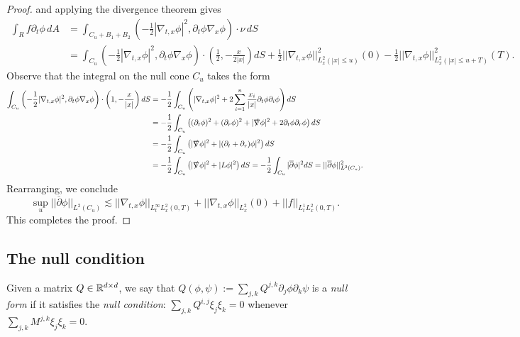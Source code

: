\begin{proof}
	and applying the divergence theorem gives
		\begin{align*}
			\int_R f \partial_t \phi \, dA
				& = \int_{C_{u} + B_1 + B_2} \left( -\frac12 |\nabla_{t, x} \phi|^2, \partial_t \phi \nabla_x \phi \right) \cdot \nu \, dS \\
				&= \int_{C_{u}} \left( -\frac12 |\nabla_{t, x} \phi|^2, \partial_t \phi \nabla_x \phi \right) \cdot  \left( \frac12, -\frac{x}{2|x|} \right)  dS + \frac12 || \nabla_{t, x} \phi||^2_{L^2_x (|x| \leq u)} (0) - \frac12 ||\nabla_{t, x} \phi||_{L^2_x (|x| \leq u + T)}^2 (T).
		\end{align*}	
	Observe that the integral on the null cone $C_u$ takes the form
		\begin{align*}
			\int_{C_u} \left( -\frac12 |\nabla_{t, x} \phi|^2, \partial_t \phi \nabla_x \phi \right) \cdot \left( 1, -\frac{x}{|x|} \right) dS
				&= - \frac12 \int_{C_u} \left( |\nabla_{t, x} \phi|^2  + 2 \sum_{i = 1}^n \frac{x_i}{|x|} \partial_t \phi \partial_i \phi \right) dS \\
				&= - \frac12 \int_{C_u} \left( (\partial_t \phi)^2 + (\partial_r \phi)^2 + |\slashed \nabla \phi|^2 + 2\partial_t \phi \partial_r \phi\right) dS\\
				&= - \frac12 \int_{C_u} \left(|\slashed \nabla \phi|^2 + |(\partial_t + \partial_r) \phi|^2\right)  dS\\
				&= -\frac12 \int_{C_u} \left(|\slashed \nabla \phi|^2 + |L \phi|^2 \right)  dS = - \frac12 \int_{C_u} |\overline\partial \phi|^2 dS = ||\overline \partial \phi||_{L^2 (C_u)}^2.
		\end{align*}	
	Rearranging, we conclude
			\[  \sup_{u} ||\overline \partial \phi ||_{L^2 (C_u)} \lesssim || \nabla_{t, x} \phi ||_{L^\infty_t L^2_x (0, T)}  +  ||\nabla_{t, x} \phi||_{L^2_x} (0)+ ||f||_{L^1_t L^2_x (0, T)}.\]
	This completes the proof. 	
\end{proof}

\subsection{The null condition}

\begin{definition}
	Given a matrix $Q \in \mathbb R^{d \times d}$, we say that $Q(\phi, \psi) := \sum_{j, k} Q^{j, k} \partial_j \phi \partial_k \psi$ is a \emph{null form} if it satisfies the \emph{null condition}: $\sum_{j, k} Q^{i, j} \xi_j \xi_k = 0$ whenever $\sum_{j, k} M^{j, k} \xi_j \xi_k = 0$.
\end{definition}

